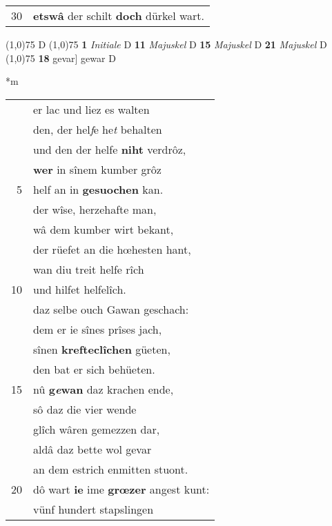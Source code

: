 \documentclass[8pt,a4paper,notitlepage]{article}
\begin{document}
\begin{table}[ht]
\begin{minipage}[t]{0.5\linewidth}
\begin{tabular}{rl}
30 & \textbf{etswâ} der schilt \textbf{doch} dürkel wart.\\ 
\end{tabular}
\scriptsize
\line(1,0){75} \newline
D \newline
\line(1,0){75} \newline
\textbf{1} \textit{Initiale} D  \textbf{11} \textit{Majuskel} D  \textbf{15} \textit{Majuskel} D  \textbf{21} \textit{Majuskel} D  \newline
\line(1,0){75} \newline
\textbf{18} gevar] gewar D \newline
\end{minipage}
\hspace{0.5cm}
\begin{minipage}[t]{0.5\linewidth}
\small
\begin{center}*m
\end{center}
\begin{tabular}{rl}
 & er lac und liez es walten\\ 
 & den, der hel\textit{f}e he\textit{t} behalten\\ 
 & und den der helfe \textbf{niht} verdrôz,\\ 
 & \textbf{wer} in sînem kumber grôz\\ 
5 & helf an in \textbf{gesuochen} kan.\\ 
 & der wîse, herzehafte man,\\ 
 & wâ dem kumber wirt bekant,\\ 
 & der rüefet an die hœhesten hant,\\ 
 & wan diu treit helfe rîch\\ 
10 & und hilfet helfelîch.\\ 
 & daz selbe ouch Gawan geschach:\\ 
 & dem er ie sînes prîses jach,\\ 
 & sînen \textbf{krefteclîchen} güeten,\\ 
 & den bat er sich behüeten.\\ 
15 & nû \textbf{g\textit{e}wan} daz krachen ende,\\ 
 & sô daz die vier wende\\ 
 & glîch wâren gemezzen dar,\\ 
 & aldâ daz bette wol gevar\\ 
 & an dem estrich enmitten stuont.\\ 
20 & dô wart \textbf{ie} ime \textbf{grœzer} angest kunt:\\ 
 & vünf hundert stapslingen\\ 

\end{tabular}
\end{minipage}
\end{table}
\end{document}
